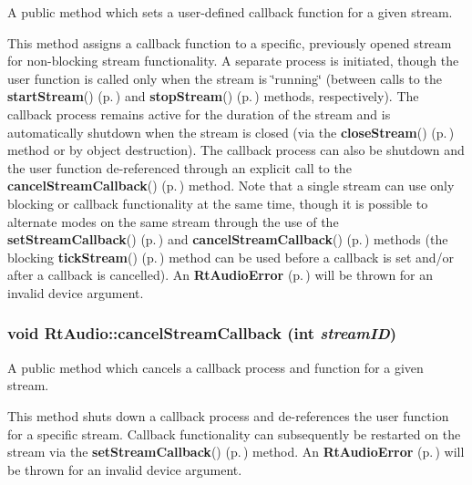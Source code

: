 A public method which sets a user-defined callback function for a given stream.

This method assigns a callback function to a specific, previously opened stream for non-blocking stream functionality. A separate process is initiated, though the user function is called only when the stream is \char`\"{}running\char`\"{} (between calls to the {\bf start\-Stream}() {\rm (p.\,\pageref{classRtAudio_a11})} and {\bf stop\-Stream}() {\rm (p.\,\pageref{classRtAudio_a12})} methods, respectively). The callback process remains active for the duration of the stream and is automatically shutdown when the stream is closed (via the {\bf close\-Stream}() {\rm (p.\,\pageref{classRtAudio_a10})} method or by object destruction). The callback process can also be shutdown and the user function de-referenced through an explicit call to the {\bf cancel\-Stream\-Callback}() {\rm (p.\,\pageref{classRtAudio_a5})} method. Note that a single stream can use only blocking or callback functionality at the same time, though it is possible to alternate modes on the same stream through the use of the {\bf set\-Stream\-Callback}() {\rm (p.\,\pageref{classRtAudio_a4})} and {\bf cancel\-Stream\-Callback}() {\rm (p.\,\pageref{classRtAudio_a5})} methods (the blocking {\bf tick\-Stream}() {\rm (p.\,\pageref{classRtAudio_a9})} method can be used before a callback is set and/or after a callback is cancelled). An {\bf Rt\-Audio\-Error} {\rm (p.\,\pageref{classRtAudioError})} will be thrown for an invalid device argument. 
\subsubsection{\setlength{\rightskip}{0pt plus 5cm}void Rt\-Audio::cancel\-Stream\-Callback (int {\em stream\-ID})}\label{classRtAudio_a5}


A public method which cancels a callback process and function for a given stream.

This method shuts down a callback process and de-references the user function for a specific stream. Callback functionality can subsequently be restarted on the stream via the {\bf set\-Stream\-Callback}() {\rm (p.\,\pageref{classRtAudio_a4})} method. An {\bf Rt\-Audio\-Error} {\rm (p.\,\pageref{classRtAudioError})} will be thrown for an invalid device argument. 
